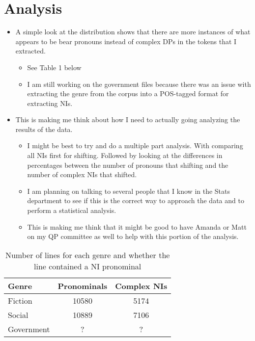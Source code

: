 \documentclass[12pt, letterpaper]{article}
\begin{document}
\section*{Analysis}
\begin{itemize}
	\item A simple look at the distribution shows that there are more instances of what appears to be bear pronouns instead of complex DPs in the tokens that I extracted.
	\begin{itemize}
		\item See Table 1 below
		\item I am still working on the government files because there was an issue with extracting the genre from the corpus into a POS-tagged format for extracting NIs.
	\end{itemize}
	\item This is making me think about how I need to actually going analyzing the results of the data.
	\begin{itemize}
		\item I might be best to try and do a multiple part analysis. With comparing all NIs first for shifting. Followed by looking at the differences in percentages between the number of pronouns that shifting and the number of complex NIs that shifted.
		\item I am planning on talking to several people that I know in the Stats department to see if this is the correct way to approach the data and to perform a statistical analysis.
		\item This is making me think that it might be good to have Amanda or Matt on my QP committee as well to help with this portion of the analysis.
	\end{itemize}
\end{itemize}

\begin{table}[!h]
	\centering
\caption{Number of lines for each genre and whether the line contained a NI pronominal}
\begin{tabular}{lcc}
	Genre & Pronominals & Complex NIs \\ 
	\hline 
	\hline
	Fiction & 10580 & 5174 \\ 

	Social & 10889 & 7106 \\ 

	Government & ? & ? \\ 

\end{tabular} 
\end{table}
\end{document}

